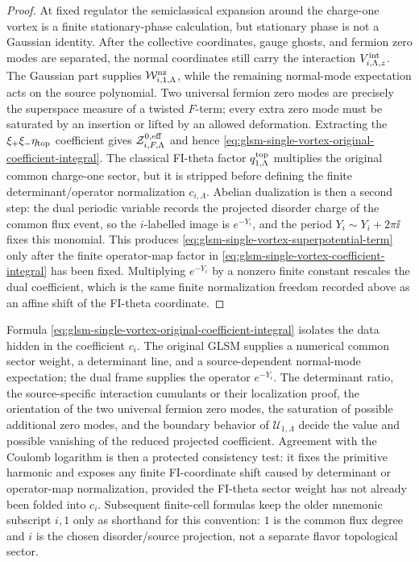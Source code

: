 \begin{proof}
At fixed regulator the semiclassical expansion around the charge-one vortex
is a finite stationary-phase calculation, but stationary phase is not a
Gaussian identity.  After the collective coordinates, gauge ghosts, and
fermion zero modes are separated, the normal coordinates still carry the
interaction \(V^{\rm int}_{i,\Lambda,z}\).  The Gaussian part supplies
\(\mathcal W^{\rm nz}_{i,1,\Lambda}\), while the remaining normal-mode
expectation acts on the source polynomial.  Two universal fermion zero modes
are precisely the superspace measure of a twisted \(F\)-term; every extra zero
mode must be saturated by an insertion or lifted by an allowed deformation.
Extracting the \(\xi_+\xi_-\eta_{\rm top}\) coefficient gives
\(\mathcal Z^{0,{\rm eff}}_{i,F,\Lambda}\) and hence
\eqref{eq:glsm-single-vortex-original-coefficient-integral}.  The classical
FI-theta factor \(q^{\rm top}_{1,\Lambda}\) multiplies the original common
charge-one sector, but it is stripped before defining the finite
determinant/operator normalization \(c_{i,\Lambda}\).  Abelian dualization is
then a second step: the dual periodic variable records the projected disorder
charge of the common flux event, so the \(i\)-labelled image is \(e^{-Y_i}\),
and the period \(Y_i\sim Y_i+2\pi\ii\) fixes this monomial.  This
produces \eqref{eq:glsm-single-vortex-superpotential-term} only after the
finite operator-map factor in
\eqref{eq:glsm-single-vortex-coefficient-integral} has been fixed.
Multiplying \(e^{-Y_i}\) by a nonzero finite constant rescales the dual
coefficient, which is the same finite normalization freedom recorded above as
an affine shift of the FI-theta coordinate.
\end{proof}

Formula
\eqref{eq:glsm-single-vortex-original-coefficient-integral} isolates the data
hidden in the coefficient \(c_i\).  The original GLSM supplies a numerical
common sector weight, a determinant line, and a source-dependent normal-mode
expectation; the dual frame supplies the operator \(e^{-Y_i}\).  The determinant
ratio, the source-specific interaction cumulants or their localization proof,
the orientation of the two universal fermion zero modes, the saturation of
possible additional zero modes, and the boundary behavior of
\(\mathcal U_{1,\Lambda}\) decide the value and possible vanishing of the
reduced projected coefficient.  Agreement with the Coulomb logarithm is then a protected
consistency test: it fixes the primitive harmonic and exposes any finite
FI-coordinate shift caused by determinant or operator-map normalization,
provided the FI-theta sector weight has not already been folded into \(c_i\).
Subsequent finite-cell formulas keep the older mnemonic subscript \(i,1\) only
as shorthand for this convention: \(1\) is the common flux degree and \(i\) is
the chosen disorder/source projection, not a separate flavor topological
sector.

